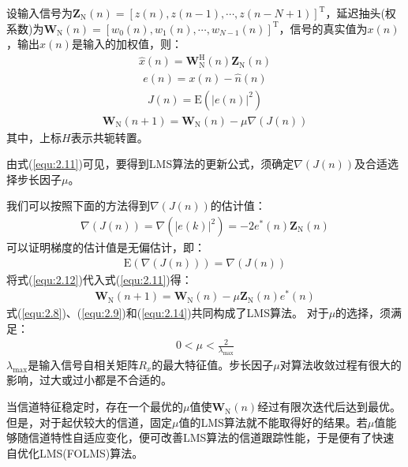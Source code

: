 设输入信号为$\mathbf{Z}_{\mathrm{N}}(n)=[z(n),z(n-1),\cdots,z(n-N+1)]^{\mathrm{T}}$，延迟抽头(权系数)为$\mathbf{W}_{\mathrm{N}}(n)=[w_0(n),w_1(n),\cdots,w_{N-1}(n)]^{\mathrm{T}}$，信号的真实值为$x(n)$，输出$\hat{x}(n)$是输入的加权值，则：
\begin{eqnarray}
    \hat{x}(n)=\mathbf{W}_{\mathrm{N}}^{\mathrm{H}}(n)\mathbf{Z}_{\mathrm{N}}(n)
    \label{equ:2.8}
\end{eqnarray}
\begin{eqnarray}
    e(n)=x(n)-\hat{n}(n)
    \label{equ:2.9}
\end{eqnarray}
\begin{eqnarray}
    J(n)=\mathrm{E}(|e(n)|^2)
    \label{equ:2.10}
\end{eqnarray}
\begin{eqnarray}
    \mathbf{W}_{\mathrm{N}}(n+1)=\mathbf{W}_{\mathrm{N}}(n)-\mu\nabla(J(n))
    \label{equ:2.11}
\end{eqnarray}
其中，上标$H$表示共轭转置。

由式(\ref{equ:2.11})可见，要得到LMS算法的更新公式，须确定$\nabla(J(n))$及合适选择步长因子$\mu$。

我们可以按照下面的方法得到$\nabla(J(n))$的估计值：
\begin{eqnarray}
    \nabla(J(n))=\nabla(|e(k)|^2)=-2e^*(n)\mathbf{Z}_{\mathrm{N}}(n)
    \label{equ:2.12}
\end{eqnarray}
可以证明梯度的估计值是无偏估计，即：
\begin{eqnarray}
    \mathrm{E}(\nabla(J(n)))=\nabla(J(n))
    \label{equ:2.13}
\end{eqnarray}
将式(\ref{equ:2.12})代入式(\ref{equ:2.11})得：
\begin{eqnarray}
    \mathbf{W}_{\mathrm{N}}(n+1)=\mathbf{W}_{\mathrm{N}}(n)-\mu\mathbf{Z}_{\mathrm{N}}(n)e^*(n)
    \label{equ:2.14}
\end{eqnarray}
式(\ref{equ:2.8})、(\ref{equ:2.9})和(\ref{equ:2.14})共同构成了LMS算法。
对于$\mu$的选择，须满足：
\begin{eqnarray}
    0<\mu<\frac{2}{\lambda_{\mathrm{max}}}
    \label{equ:2.15}
\end{eqnarray}
$\lambda_{\mathrm{max}}$是输入信号自相关矩阵$R_x$的最大特征值。步长因子$\mu$对算法收敛过程有很大的影响，过大或过小都是不合适的。

当信道特征稳定时，存在一个最优的$\mu$值使$\mathbf{W}_{\mathrm{N}}(n)$经过有限次迭代后达到最优。但是，对于起伏较大的信道，固定$\mu$值的LMS算法就不能取得好的结果。若$\mu$值能够随信道特性自适应变化，便可改善LMS算法的信道跟踪性能，于是便有了快速自优化LMS(FOLMS)算法。
